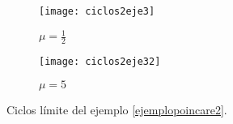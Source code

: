\begin{ejemplo}
  \begin{figure}[!tbp]
    \begin{subfigure}[b]{0.5\textwidth}
      \texttt{[image: ciclos2eje3]}
      \caption{$\mu = \frac{1}{2}$}
    \end{subfigure}
    \hfill
    \begin{subfigure}[b]{0.5\textwidth}
      \texttt{[image: ciclos2eje32]}
      \caption{$\mu=5$}
    \end{subfigure}
    \caption{Ciclos límite del ejemplo \ref{ejemplopoincare2}.}
  \end{figure}


\end{ejemplo}


